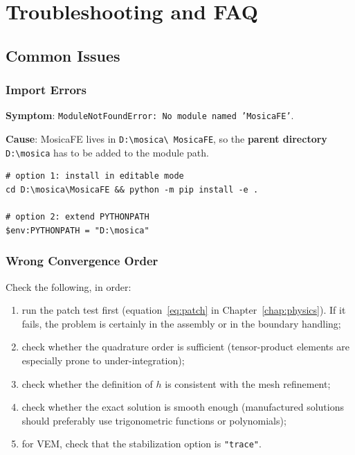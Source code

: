 \documentclass[11pt,oneside]{book}
\theoremstyle{definition}
\theoremstyle{plain}
\newcommand{\mosica}{\textsf{MosicaFE}}
\newcommand{\code}[1]{\texttt{#1}}
\begin{document}
\chapter{Troubleshooting and FAQ}
\label{chap:faq}

\section{Common Issues}

\subsection{Import Errors}

\textbf{Symptom}: \code{ModuleNotFoundError: No module named 'MosicaFE'}.

\textbf{Cause}: \mosica{} lives in \code{D:\textbackslash mosica\textbackslash
MosicaFE}, so the \textbf{parent directory} \code{D:\textbackslash mosica} has to be
added to the module path.

\begin{lstlisting}[style=shell]
# option 1: install in editable mode
cd D:\mosica\MosicaFE && python -m pip install -e .

# option 2: extend PYTHONPATH
$env:PYTHONPATH = "D:\mosica"
\end{lstlisting}

\subsection{Wrong Convergence Order}

Check the following, in order:

\begin{enumerate}[label=(\arabic*),itemsep=0.15em]
  \item run the patch test first (equation~\eqref{eq:patch} in
        Chapter~\ref{chap:physics}). If it fails, the problem is certainly in the
        assembly or in the boundary handling;
  \item check whether the quadrature order is sufficient (tensor-product elements
        are especially prone to under-integration);
  \item check whether the definition of \(h\) is consistent with the mesh refinement;
  \item check whether the exact solution is smooth enough (manufactured solutions
        should preferably use trigonometric functions or polynomials);
  \item for VEM, check that the stabilization option is \code{"trace"}.
\end{enumerate}
\end{document}
